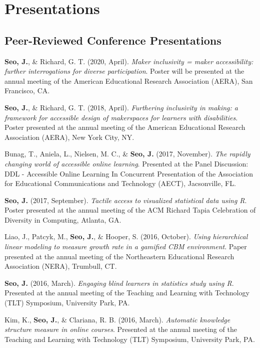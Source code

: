 \documentclass[11pt, a4paper]{awesome-cv}
\begin{document}
\hypertarget{presentations}{%
\section{Presentations}\label{presentations}}

\hypertarget{peer-reviewed-conference-presentations}{%
\subsection{Peer-Reviewed Conference
Presentations}\label{peer-reviewed-conference-presentations}}

\begingroup
\setlength{\parindent}{-0.5in}
\setlength{\leftskip}{0.5in}

\textbf{Seo, J.}, \& Richard, G. T. (2020, April). \emph{Maker
inclusivity = maker accessibility: further interrogations for diverse
participation}. Poster will be presented at the annual meeting of the
American Educational Research Association (AERA), San Francisco, CA.

\textbf{Seo, J.}, \& Richard, G. T. (2018, April). \emph{Furthering
inclusivity in making: a framework for accessible design of makerspaces
for learners with disabilities}. Poster presented at the annual meeting
of the American Educational Research Association (AERA), New York City,
NY.

Bunag, T., Aniela, L., Nielsen, M. C., \& \textbf{Seo, J.} (2017,
November). \emph{The rapidly changing world of accessible online
learning}. Presented at the Panel Discussion: DDL - Accessible Online
Learning In Concurrent Presentation of the Association for Educational
Communications and Technology (AECT), Jacsonville, FL.

\textbf{Seo, J.} (2017, September). \emph{Tactile access to visualized
statistical data using R}. Poster presented at the annual meeting of the
ACM Richard Tapia Celebration of Diversity in Computing, Atlanta, GA.

Liao, J., Patcyk, M., \textbf{Seo, J.}, \& Hooper, S. (2016, October).
\emph{Using hierarchical linear modeling to measure growth rate in a
gamified CBM environment}. Paper presented at the annual meeting of the
Northeastern Educational Research Association (NERA), Trumbull, CT.

\textbf{Seo, J.} (2016, March). \emph{Engaging blind learners in
statistics study using R}. Presented at the annual meeting of the
Teaching and Learning with Technology (TLT) Symposium, University Park,
PA.

Kim, K., \textbf{Seo, J.}, \& Clariana, R. B. (2016, March).
\emph{Automatic knowledge structure measure in online courses}.
Presented at the annual meeting of the Teaching and Learning with
Technology (TLT) Symposium, University Park, PA.
\end{document}
